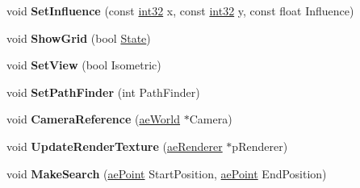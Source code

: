 \begin{DoxyCompactItemize}
\item 
void {\bfseries Set\+Influence} (const \hyperlink{namespaceae_core_a862bc39eb87cfabca273f49e2a920129}{int32} x, const \hyperlink{namespaceae_core_a862bc39eb87cfabca273f49e2a920129}{int32} y, const float Influence)\hypertarget{classae_tiled_map_aaaec14e8d52ceac9a69eb0d0db4ea940}{}\label{classae_tiled_map_aaaec14e8d52ceac9a69eb0d0db4ea940}

\item 
void {\bfseries Show\+Grid} (bool \hyperlink{_base_class_8h_aded8224779c70fab5084220935d672bba46a2a41cc6e552044816a2d04634545d}{State})\hypertarget{classae_tiled_map_a258662b085cfddb882576c85effbfca9}{}\label{classae_tiled_map_a258662b085cfddb882576c85effbfca9}

\item 
void {\bfseries Set\+View} (bool Isometric)\hypertarget{classae_tiled_map_a3cde4546fc42a71eb713c39a1a98ea09}{}\label{classae_tiled_map_a3cde4546fc42a71eb713c39a1a98ea09}

\item 
void {\bfseries Set\+Path\+Finder} (int Path\+Finder)\hypertarget{classae_tiled_map_ae724a523cc32ad46822b51cc62a3b0e6}{}\label{classae_tiled_map_ae724a523cc32ad46822b51cc62a3b0e6}

\item 
void {\bfseries Camera\+Reference} (\hyperlink{classae_world}{ae\+World} $\ast$Camera)\hypertarget{classae_tiled_map_aa0db9965530414129013d0c698a2b13d}{}\label{classae_tiled_map_aa0db9965530414129013d0c698a2b13d}

\item 
void {\bfseries Update\+Render\+Texture} (\hyperlink{classae_core_1_1ae_renderer}{ae\+Renderer} $\ast$p\+Renderer)\hypertarget{classae_tiled_map_a510e48b848df51bfcd3ea69d8bb5dab7}{}\label{classae_tiled_map_a510e48b848df51bfcd3ea69d8bb5dab7}

\item 
void {\bfseries Make\+Search} (\hyperlink{structae_core_1_1ae_point}{ae\+Point} Start\+Position, \hyperlink{structae_core_1_1ae_point}{ae\+Point} End\+Position)\hypertarget{classae_tiled_map_a5122122f68b1557224db6cc616bccd12}{}\label{classae_tiled_map_a5122122f68b1557224db6cc616bccd12}

\end{DoxyCompactItemize}
